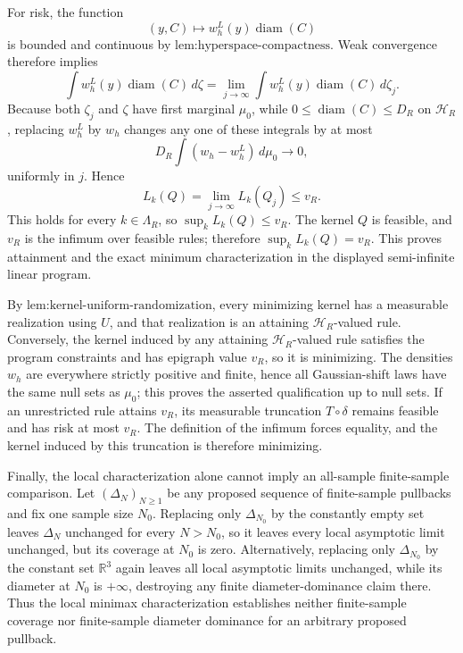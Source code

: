 For risk, the function
\[
(y,C)\longmapsto w_h^L(y)\operatorname{diam}(C)
\]
is bounded and continuous by \(\text{lem:hyperspace-compactness}\).  Weak convergence therefore implies
\[
\int w_h^L(y)\operatorname{diam}(C)\,d\zeta
=\lim_{j\to\infty}
 \int w_h^L(y)\operatorname{diam}(C)\,d\zeta_j.
\]
Because both \(\zeta_j\) and \(\zeta\) have first marginal \(\mu_0\), while \(0\le\operatorname{diam}(C)\le D_R\) on \(\mathcal H_R\), replacing \(w_h^L\) by \(w_h\) changes any one of these integrals by at most
\[
D_R\int(w_h-w_h^L)\,d\mu_0\longrightarrow0,
\]
uniformly in \(j\).  Hence
\[
L_k(Q)
=\lim_{j\to\infty}L_k(Q_j)
\le v_R.
\]
This holds for every \(k\in\Lambda_R\), so \(\sup_k L_k(Q)\le v_R\).  The kernel \(Q\) is feasible, and \(v_R\) is the infimum over feasible rules; therefore \(\sup_kL_k(Q)=v_R\).  This proves attainment and the exact minimum characterization in the displayed semi-infinite linear program.

By \(\text{lem:kernel-uniform-randomization}\), every minimizing kernel has a measurable realization using \(U\), and that realization is an attaining \(\mathcal H_R\)-valued rule.  Conversely, the kernel induced by any attaining \(\mathcal H_R\)-valued rule satisfies the program constraints and has epigraph value \(v_R\), so it is minimizing.  The densities \(w_h\) are everywhere strictly positive and finite, hence all Gaussian-shift laws have the same null sets as \(\mu_0\); this proves the asserted qualification up to null sets.  If an unrestricted rule attains \(v_R\), its measurable truncation \(T\circ\delta\) remains feasible and has risk at most \(v_R\).  The definition of the infimum forces equality, and the kernel induced by this truncation is therefore minimizing.

Finally, the local characterization alone cannot imply an all-sample finite-sample comparison.  Let \((\Delta_N)_{N\ge1}\) be any proposed sequence of finite-sample pullbacks and fix one sample size \(N_0\).  Replacing only \(\Delta_{N_0}\) by the constantly empty set leaves \(\Delta_N\) unchanged for every \(N>N_0\), so it leaves every local asymptotic limit unchanged, but its coverage at \(N_0\) is zero.  Alternatively, replacing only \(\Delta_{N_0}\) by the constant set \(\mathbb R^3\) again leaves all local asymptotic limits unchanged, while its diameter at \(N_0\) is \(+\infty\), destroying any finite diameter-dominance claim there.  Thus the local minimax characterization establishes neither finite-sample coverage nor finite-sample diameter dominance for an arbitrary proposed pullback.